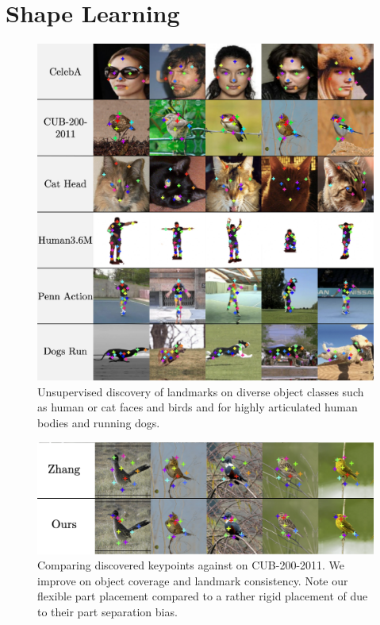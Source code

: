 \section{Shape Learning}
	\begin{figure}[htp]
		\centering
		\includegraphics[trim={0cm 0cm 0cm 0cm},clip, width=.6\linewidth]{fig/kp_mania}
		\caption{{Unsupervised discovery of landmarks on diverse object classes such as human or cat faces and birds and for highly articulated human bodies and running dogs.}}
		\label{fig:kp_mania}
	\end{figure}
	\begin{figure}[htp]
		\centering
		\includegraphics[trim={0cm 0cm 0cm 0cm},clip, width=.7\linewidth]{fig/birds1x3}
		\caption{Comparing discovered keypoints against \cite{zhang18} on CUB-200-2011. We improve on object coverage and landmark consistency. Note our flexible part placement compared to a rather rigid placement of \cite{zhang18} due to their part separation bias.}
		\label{fig:compare}
	\end{figure}

